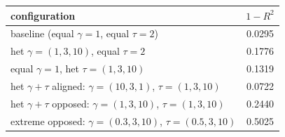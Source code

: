 \documentclass[border=2pt]{standalone}
\begin{document}
\pagecolor{placeholderbg}
\begin{tabular}{lc}
\toprule
configuration  &  $1-R^2$ \\
\midrule
  baseline (equal $\gamma=1$, equal $\tau=2$)  &  0.0295 \\
  het $\gamma=(1,3,10)$, equal $\tau=2$  &  0.1776 \\
  equal $\gamma=1$, het $\tau=(1,3,10)$  &  0.1319 \\
  het $\gamma+\tau$ aligned: $\gamma=(10,3,1)$, $\tau=(1,3,10)$  &  0.0722 \\
  het $\gamma+\tau$ opposed: $\gamma=(1,3,10)$, $\tau=(1,3,10)$  &  0.2440 \\
  extreme opposed: $\gamma=(0.3,3,10)$, $\tau=(0.5,3,10)$  &  0.5025 \\
\bottomrule
\end{tabular}
\end{document}
